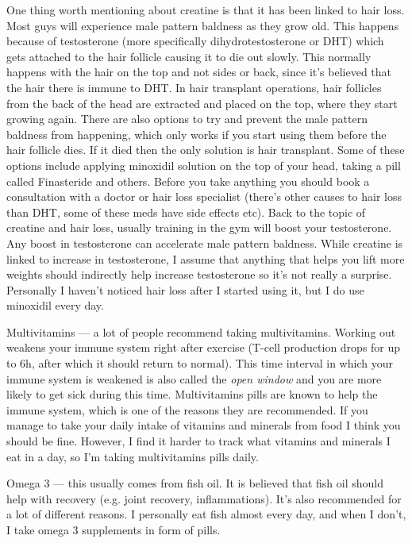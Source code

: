 \documentclass[openany, 12pt]{book}
\begin{document}
        One thing worth mentioning about creatine is that it has been linked to hair loss.
        Most guys will experience male pattern baldness as they grow old. This happens because of testosterone (more specifically
        dihydrotestosterone or DHT) which gets attached to the hair follicle causing it to die out slowly. This normally happens with the hair on the top and not sides or back, since it's believed that
        the hair there is immune to DHT. In hair transplant operations, hair follicles from the back of the head are extracted and placed on the top, where they start growing again.
        There are also options to try and prevent the male pattern baldness from happening, which only works if you start using them before the hair follicle dies. If it died then 
        the only solution is hair transplant. Some of these options include applying minoxidil solution on the top of your head, taking a pill called Finasteride and others.
        Before you take anything you should book a consultation with a doctor or hair loss specialist
        (there's other causes to hair loss than DHT, some of these meds have side effects etc).
        Back to the topic of creatine and hair loss, usually training in the gym will boost your testosterone. Any boost in testosterone can accelerate male pattern baldness. While creatine is linked
        to increase in testosterone, I assume that anything that helps you lift more weights should indirectly help increase testosterone so it's not really a surprise.
        Personally I haven't noticed hair loss after I started using it, but I do use minoxidil every day.

        Multivitamins --- a lot of people recommend taking multivitamins. Working out weakens your immune system right after exercise
        (T-cell production drops for up to 6h, after which it should return to normal).
        This time interval in which your immune system is weakened is also called the \textit{open window} and you are more likely to get sick during this time.
        Multivitamins pills are known to help the immune system, which is one of the reasons they are recommended. If you manage to take your daily intake of vitamins and minerals from food I think
        you should be fine.
        However, I find it harder to track what vitamins and minerals I eat in a day, so I'm taking multivitamins pills daily.

        Omega 3 --- this usually comes from fish oil. It is believed that fish oil should help with recovery (e.g. joint recovery, inflammations). It's also recommended for a lot of different reasons.
        I personally eat fish almost every day, and when I don't, I take omega 3 supplements in form of pills.
\end{document}
